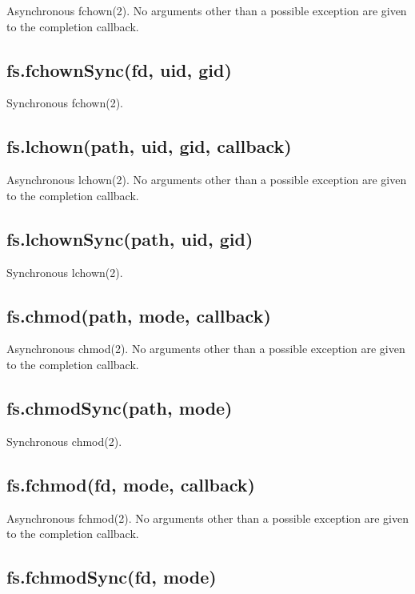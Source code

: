 Asynchronous fchown(2). No arguments other than a possible exception are
given to the completion callback.

\subsection{fs.fchownSync(fd, uid, gid)}\label{fs.fchownsyncfd-uid-gid}

Synchronous fchown(2).

\subsection{fs.lchown(path, uid, gid,
callback)}\label{fs.lchownpath-uid-gid-callback}

Asynchronous lchown(2). No arguments other than a possible exception are
given to the completion callback.

\subsection{fs.lchownSync(path, uid,
gid)}\label{fs.lchownsyncpath-uid-gid}

Synchronous lchown(2).

\subsection{fs.chmod(path, mode,
callback)}\label{fs.chmodpath-mode-callback}

Asynchronous chmod(2). No arguments other than a possible exception are
given to the completion callback.

\subsection{fs.chmodSync(path, mode)}\label{fs.chmodsyncpath-mode}

Synchronous chmod(2).

\subsection{fs.fchmod(fd, mode,
callback)}\label{fs.fchmodfd-mode-callback}

Asynchronous fchmod(2). No arguments other than a possible exception are
given to the completion callback.

\subsection{fs.fchmodSync(fd, mode)}\label{fs.fchmodsyncfd-mode}

